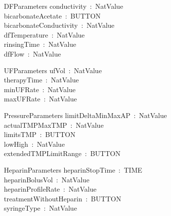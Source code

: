 \begin{schema}{DFParameters}
    conductivity~:~NatValue\\
    bicarbonateAcetate~:~BUTTON\\%
    bicarbonateConductivity~:~NatValue\\
    dfTemperature~:~NatValue\\
    rinsingTime~:~NatValue\\
    dfFlow~:~NatValue\\
\end{schema}

\begin{schema}{UFParameters}
    ufVol~:~NatValue\\
    therapyTime~:~NatValue\\
    minUFRate~:~NatValue\\
    maxUFRate~:~NatValue\\
\end{schema}
\begin{schema}{PressureParameters}
    limitDeltaMinMaxAP~:~NatValue\\
    actualTMPMaxTMP~:~NatValue\\
    limitsTMP~:~BUTTON\\
    lowHigh~:~NatValue\\
    extendedTMPLimitRange~:~BUTTON\\
\end{schema}
\begin{schema}{HeparinParameters}
    heparinStopTime~:~TIME\\
    heparinBolusVol~:~NatValue\\
    heparinProfileRate~:~NatValue\\
    treatmentWithoutHeparin~:~BUTTON\\
    syringeType~:~NatValue
\end{schema}
